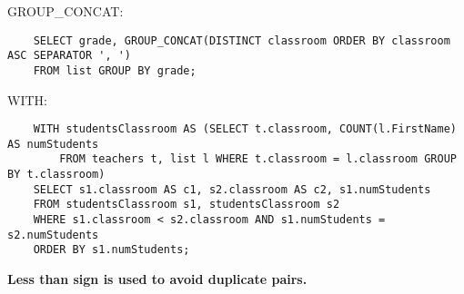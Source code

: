 \documentclass[9pt]{extarticle}
\begin{document}
GROUP\_CONCAT:
\begin{verbatim}
    SELECT grade, GROUP_CONCAT(DISTINCT classroom ORDER BY classroom ASC SEPARATOR ', ') 
    FROM list GROUP BY grade;
\end{verbatim}

WITH:
\begin{verbatim}
    WITH studentsClassroom AS (SELECT t.classroom, COUNT(l.FirstName) AS numStudents 
        FROM teachers t, list l WHERE t.classroom = l.classroom GROUP BY t.classroom)
    SELECT s1.classroom AS c1, s2.classroom AS c2, s1.numStudents
    FROM studentsClassroom s1, studentsClassroom s2
    WHERE s1.classroom < s2.classroom AND s1.numStudents = s2.numStudents
    ORDER BY s1.numStudents;
\end{verbatim}
\textbf{Less than sign is used to avoid duplicate pairs.}
\end{document}
